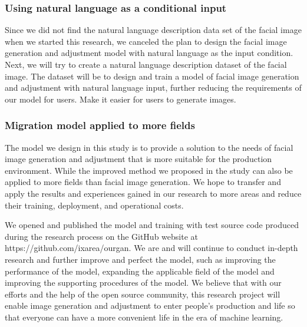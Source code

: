 \subsubsection*{Using natural language as a conditional input}
Since we did not find the natural language description data set of the facial image when we started this research, we canceled the plan to design the facial image generation and adjustment model with natural language as the input condition.
Next, we will try to create a natural language description dataset of the facial image. The dataset will be to design and train a model of facial image generation and adjustment with natural language input, further reducing the requirements of our model for users. Make it easier for users to generate images.
\subsubsection*{Migration model applied to more fields}
The model we design in this study is to provide a solution to the needs of facial image generation and adjustment that is more suitable for the production environment.
While the improved method we proposed in the study can also be applied to more fields than facial image generation.
We hope to transfer and apply the results and experiences gained in our research to more areas and reduce their training, deployment, and operational costs.

\vspace{4ex}

We opened and published the model and training with test source code produced during the research process on the GitHub website at https://github.com/ixarea/ourgan. We are and will continue to conduct in-depth research and further improve and perfect the model, such as improving the performance of the model, expanding the applicable field of the model and improving the supporting procedures of the model. We believe that with our efforts and the help of the open source community, this research project will enable image generation and adjustment to enter people's production and life so that everyone can have a more convenient life in the era of machine learning.






